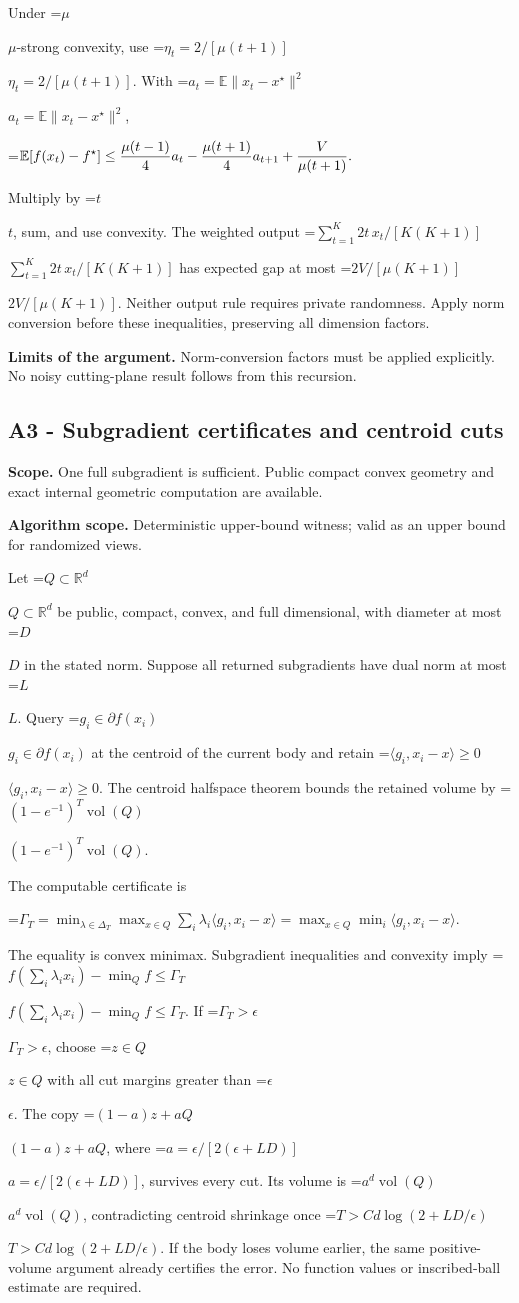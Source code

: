 \documentclass[10pt,a4paper]{article}
\newcommand{\AtlasMath}[1]{\par\begingroup\centering\setbox0=\hbox{$\displaystyle #1$}\ifdim\wd0>1.4\linewidth\typeout{ATLAS WIDE FORMULA: \the\wd0}\fi\ifdim\wd0>\linewidth\resizebox{\linewidth}{!}{\box0}\else\box0\fi\par\endgroup}
\newcommand{\AtlasInlineMath}[1]{\begingroup\setbox0=\hbox{$#1$}\ifdim\wd0>.4\linewidth\endgroup\AtlasMath{#1}\else\endgroup$#1$\fi}
\begin{document}
Under \AtlasInlineMath{\mu}-strong convexity, use \AtlasInlineMath{\eta_t=2/[\mu(t+1)]}. With \AtlasInlineMath{a_t=\mathbb E\|x_t-x^\star\|^2},

\AtlasMath{\mathbb E[f(x_t)-f^\star]\le{\mu(t-1)\over4}a_t
-{\mu(t+1)\over4}a_{t+1}+{V\over\mu(t+1)}.}

Multiply by \AtlasInlineMath{t}, sum, and use convexity. The weighted output
\AtlasInlineMath{\sum_{t=1}^K2t\,x_t/[K(K+1)]} has expected gap at most \AtlasInlineMath{2V/[\mu(K+1)]}. Neither output rule requires private randomness. Apply norm conversion before these inequalities, preserving all dimension factors.

\textbf{Limits of the argument.} Norm-conversion factors must be applied explicitly. No noisy cutting-plane result follows from this recursion.

\subsection{A3 - Subgradient certificates and centroid cuts}
\textbf{Scope.} One full subgradient is sufficient. Public compact convex geometry and exact internal geometric computation are available.

\textbf{Algorithm scope.} Deterministic upper-bound witness; valid as an upper bound for randomized views.

Let \AtlasInlineMath{Q\subset\mathbb R^d} be public, compact, convex, and full dimensional, with diameter at most \AtlasInlineMath{D} in the stated norm. Suppose all returned subgradients have dual norm at most \AtlasInlineMath{L}. Query \AtlasInlineMath{g_i\in\partial f(x_i)} at the centroid of the current body and retain \AtlasInlineMath{\langle g_i,x_i-x\rangle\ge0}. The centroid halfspace theorem bounds the retained volume by \AtlasInlineMath{(1-e^{-1})^T\operatorname{vol}(Q)}.

The computable certificate is

\AtlasMath{\Gamma_T=\min_{\lambda\in\Delta_T}\max_{x\in Q}\sum_i\lambda_i\langle g_i,x_i-x\rangle
=\max_{x\in Q}\min_i\langle g_i,x_i-x\rangle.}

The equality is convex minimax. Subgradient inequalities and convexity imply
\AtlasInlineMath{f(\sum_i\lambda_ix_i)-\min_Qf\le\Gamma_T}.
If \AtlasInlineMath{\Gamma_T>\epsilon}, choose \AtlasInlineMath{z\in Q} with all cut margins greater than \AtlasInlineMath{\epsilon}. The copy \AtlasInlineMath{(1-a)z+aQ}, where \AtlasInlineMath{a=\epsilon/[2(\epsilon+LD)]}, survives every cut. Its volume is \AtlasInlineMath{a^d\operatorname{vol}(Q)}, contradicting centroid shrinkage once \AtlasInlineMath{T>C d\log(2+LD/\epsilon)}. If the body loses volume earlier, the same positive-volume argument already certifies the error. No function values or inscribed-ball estimate are required.
\end{document}
